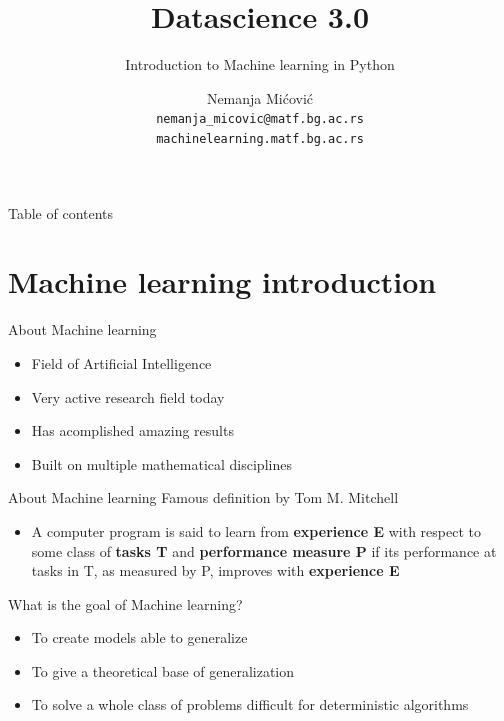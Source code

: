 \documentclass[aspectratio=169]{beamer}
\title{\Large{Datascience 3.0}}
\subtitle{Introduction to Machine learning in Python}
\author{Nemanja Mićović \\ \texttt{nemanja\_micovic@matf.bg.ac.rs} \\ \texttt{machinelearning.matf.bg.ac.rs}}
\institute{Faculty of Mathematics, University of Belgrade}
\begin{document}
\begin{frame}
    \maketitle
\end{frame}

\begin{frame}{Table of contents}
    \tableofcontents
\end{frame}

\section{Machine learning introduction}
\begin{frame}{About Machine learning}
    \begin{itemize}
        \item Field of Artificial Intelligence
        \item Very active research field today
        \item Has acomplished amazing results
        \item Built on multiple mathematical disciplines
    \end{itemize}
\end{frame}
\begin{frame}{About Machine learning}
    Famous definition by Tom M. Mitchell
    \begin{itemize}
        \item A computer program is said to learn from \textbf{experience E}  with respect to some class of \textbf{tasks T}
            and \textbf{performance measure P} if its performance at tasks in T, as measured by P, improves with \textbf{experience E}
    \end{itemize}
    What is the goal of Machine learning?
    \begin{itemize}
        \item To create models able to generalize
        \item To give a theoretical base of generalization
        \item To solve a whole class of problems difficult for deterministic algorithms
    \end{itemize}
\end{frame}
\end{document}
